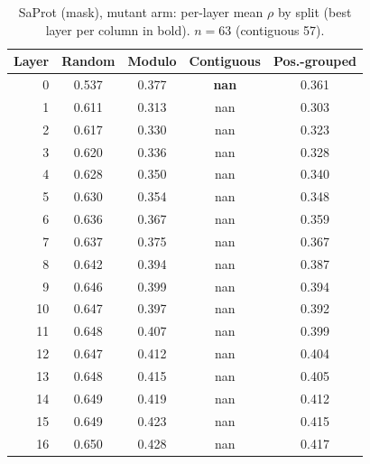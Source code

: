 \documentclass[11pt,a4paper]{article}
\begin{document}
\begin{table}[H]\centering\small

\caption{SaProt (mask), mutant arm: per-layer mean $\rho$ by split (best layer per column in bold). $n=63$ (contiguous 57).}

\label{tab:S2SaProtmaskmutant}

\begin{tabular}{rcccc}

\toprule

Layer & Random & Modulo & Contiguous & Pos.-grouped \\

\midrule

0 & 0.537 & 0.377 & \textbf{nan} & 0.361 \\

1 & 0.611 & 0.313 & nan & 0.303 \\

2 & 0.617 & 0.330 & nan & 0.323 \\

3 & 0.620 & 0.336 & nan & 0.328 \\

4 & 0.628 & 0.350 & nan & 0.340 \\

5 & 0.630 & 0.354 & nan & 0.348 \\

6 & 0.636 & 0.367 & nan & 0.359 \\

7 & 0.637 & 0.375 & nan & 0.367 \\

8 & 0.642 & 0.394 & nan & 0.387 \\

9 & 0.646 & 0.399 & nan & 0.394 \\

10 & 0.647 & 0.397 & nan & 0.392 \\

11 & 0.648 & 0.407 & nan & 0.399 \\

12 & 0.647 & 0.412 & nan & 0.404 \\

13 & 0.648 & 0.415 & nan & 0.405 \\

14 & 0.649 & 0.419 & nan & 0.412 \\

15 & 0.649 & 0.423 & nan & 0.415 \\

16 & 0.650 & 0.428 & nan & 0.417 \\


\end{tabular}
\end{table}
\end{document}
